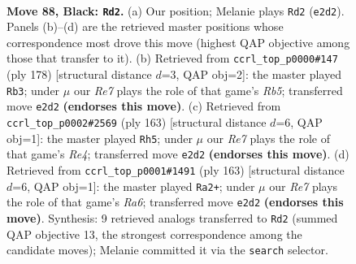 \documentclass[11pt]{article}
\begin{document}
\clearpage

\begin{figure}[p]\centering
\begin{subfigure}{0.46\textwidth}\centering
\resizebox{\linewidth}{!}{%
\newchessgame
\chessboard[
  setfen={7R/5k2/8/5p2/8/7K/4r3/8 b - - 5 88},
  showmover=false,
  pgfstyle=straightmove, color=movearrow, markmove={e2-d2}
]}
\caption{}
\end{subfigure}\hfill
\begin{subfigure}{0.46\textwidth}\centering
\resizebox{\linewidth}{!}{%
\newchessgame
\chessboard[
  setfen={2k5/8/8/1R6/2r5/8/4K3/8 w - - 10 90},
  showmover=false,
  pgfstyle=straightmove, color=movearrow, markmove={b5-b3}
]}
\caption{}
\end{subfigure}
\\[4pt]
\begin{subfigure}{0.46\textwidth}\centering
\resizebox{\linewidth}{!}{%
\newchessgame
\chessboard[
  setfen={8/6RP/p1k5/4r3/8/5K2/8/8 b - - 4 82},
  showmover=false,
  pgfstyle=straightmove, color=movearrow, markmove={e5-h5}
]}
\caption{}
\end{subfigure}\hfill
\begin{subfigure}{0.46\textwidth}\centering
\resizebox{\linewidth}{!}{%
\newchessgame
\chessboard[
  setfen={8/6k1/1R6/8/6P1/r7/6K1/8 b - - 4 82},
  showmover=false,
  pgfstyle=straightmove, color=movearrow, markmove={a3-a2}
]}
\caption{}
\end{subfigure}
\caption{\textbf{Move 88, Black: \texttt{Rd2}.} (a) Our position; Melanie plays \texttt{Rd2} (\texttt{e2d2}). Panels (b)--(d) are the retrieved master positions whose correspondence most drove this move (highest QAP objective among those that transfer to it). (b) Retrieved from \texttt{ccrl\_top\_p0000\#147} (ply 178) [structural distance $d$=3, QAP obj=2]: the master played \texttt{Rb3}; under $\mu$ our \emph{Re7} plays the role of that game's \emph{Rb5}; transferred move \texttt{e2d2} \textbf{(endorses this move)}. (c) Retrieved from \texttt{ccrl\_top\_p0002\#2569} (ply 163) [structural distance $d$=6, QAP obj=1]: the master played \texttt{Rh5}; under $\mu$ our \emph{Re7} plays the role of that game's \emph{Re4}; transferred move \texttt{e2d2} \textbf{(endorses this move)}. (d) Retrieved from \texttt{ccrl\_top\_p0001\#1491} (ply 163) [structural distance $d$=6, QAP obj=1]: the master played \texttt{Ra2+}; under $\mu$ our \emph{Re7} plays the role of that game's \emph{Ra6}; transferred move \texttt{e2d2} \textbf{(endorses this move)}. Synthesis: 9 retrieved analogs transferred to \texttt{Rd2} (summed QAP objective 13, the strongest correspondence among the candidate moves); Melanie committed it via the \texttt{search} selector.}
\label{fig:thought-m175}
\end{figure}
\end{document}
